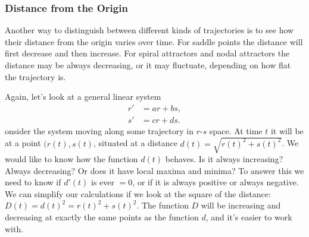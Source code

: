 \subsubsection{Distance from the Origin}
\label{subsubsec:distance-from-the-origin}

Another way to distinguish between different kinds of trajectories is
to see how their distance from the origin varies over time. For saddle
points the distance will first decrease and then increase.  For spiral
attractors and nodal attractors the distance may be always decreasing,
or it may fluctuate, depending on how flat the trajectory is.

Again, let's look at a general linear system
\begin{align*}
r' &=  ar +bs,  \\
s' &=  cr + ds.
\end{align*}
onsider the system moving along some trajectory in $r$-$s$ space.  At
time $t$ it will be at a point $(r(t), s(t)$, situated at a distance
$d(t) = \sqrt{r(t)^2 + s(t)^2}$.  We would like to know how the
function $d(t)$ behaves.  Is it always increasing?  Always decreasing?
Or does it have local maxima and minima?  To answer this we need to
know if $d'(t)$ is ever $=0$, or if it is always positive or always
negative.  We can simplify our calculations if we look at the square
of the distance: $D(t) = d(t)^2 =r(t)^2 + s(t)^2$.  The function $D$
will be increasing and decreasing at exactly the same points as the
function $d$, and it's easier to work with.


